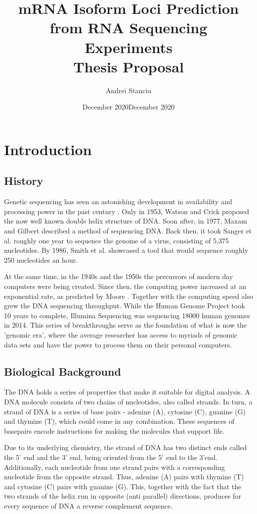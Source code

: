 \documentclass[12pt]{article}
\title{%
    mRNA Isoform Loci Prediction from RNA Sequencing Experiments \\
    \large Thesis Proposal}
\author{Andrei Stanciu}
\date{December 2020}\date{December 2020}
\begin{document}
\maketitle

\section{Introduction}


\subsection{History}
Genetic sequencing has seen an astonishing development in availability and processing power in the past century
\cite{Hood2003}. Only in 1953, Watson and Crick \cite{WATSON1953} proposed the now well known double helix structure of DNA. Soon after, in 1977, Maxam and Gilbert \cite{Maxam1977} described a method of sequencing DNA. Back then, it took Sanger et al. \cite{Sanger1977} roughly one year to sequence the genome of a virus, consisting of 5,375 nucleotides. By 1986, Smith et al. \cite{Smith1986} showcased a tool that would sequence roughly 250 nucleotides an hour. 

At the same time, in the 1940s and the 1950s the precursors of modern day computers were being created. Since then, the computing power increased at an exponential rate, as predicted by Moore \cite{Moore2006}. Together with the computing speed also grew the DNA sequencing throughput. While the Human Genome Project took 10 years to complete, Illumina Sequencing \cite{illuminaSeq} was sequencing 18000 human genomes in 2014. This series of breakthroughs serve as the foundation of what is now the 'genomic era', where the average researcher has access to myriads of genomic data sets and have the power to process them on their personal computers.   

\subsection{Biological Background}
The DNA holds a series of properties that make it suitable for digital analysis. A DNA molecule consists of two chains of nucleotides, also called strands. In turn, a strand of DNA is a series of  base pairs - adenine (A), cytosine (C), guanine (G) and thymine (T), which could come in any combination. These sequences of basepairs encode instructions for making the molecules that support life. 


Due to its underlying chemistry, the strand of DNA has two distinct ends called the 5' end and the 3' end, being oriented from the 5' end to the 3'end. Additionally, each nucleotide from one strand pairs with a corresponding nucleotide from the opposite strand. Thus, adenine (A) pairs with thymine (T) and cytosine (C) pairs with guanine (G). This, together with the fact that the two strands of the helix run in opposite (anti parallel) directions, produces for every sequence of DNA a reverse complement sequence. 
\end{document}
